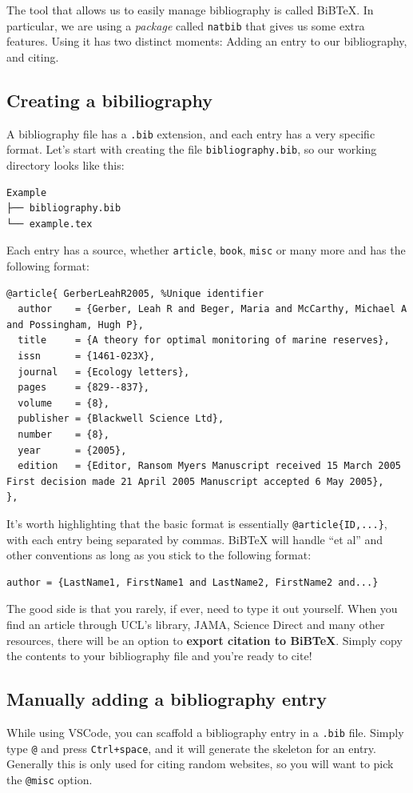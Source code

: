 The tool that allows us to easily manage bibliography is called BiBTeX. In particular, we are using a \emph{package} called \verb|natbib| that gives us some extra features.
Using it has two distinct moments: Adding an entry to our bibliography, and citing.

\clearpage
\subsection{Creating a bibiliography}
A bibliography file has a \verb|.bib| extension, and each entry has a very specific format.
Let's start with creating the file \verb|bibliography.bib|, so our working directory looks like this:
\begin{verbatim}
Example
├── bibliography.bib
└── example.tex
\end{verbatim}

Each entry has a source, whether \verb|article|, \verb|book|, \verb|misc| or many more and has the following format:
\begin{lstlisting}
@article{ GerberLeahR2005, %Unique identifier
  author    = {Gerber, Leah R and Beger, Maria and McCarthy, Michael A and Possingham, Hugh P},
  title     = {A theory for optimal monitoring of marine reserves},
  issn      = {1461-023X},
  journal   = {Ecology letters},
  pages     = {829--837},
  volume    = {8},
  publisher = {Blackwell Science Ltd},
  number    = {8},
  year      = {2005},
  edition   = {Editor, Ransom Myers Manuscript received 15 March 2005 First decision made 21 April 2005 Manuscript accepted 6 May 2005},
},
\end{lstlisting}

It's worth highlighting that the basic format is essentially \verb|@article{ID,...}|, with each entry being separated by commas.
BiBTeX will handle ``et al'' and other conventions as long as you stick to the following format:
\begin{lstlisting}
author = {LastName1, FirstName1 and LastName2, FirstName2 and...}
\end{lstlisting}

The good side is that you rarely, if ever, need to type it out yourself.
When you find an article through UCL's library, JAMA, Science Direct and many other resources, there will be an option to \textbf{export citation to BiBTeX}.
Simply copy the contents to your bibliography file and you're ready to cite!

\subsection{Manually adding a bibliography entry}
While using VSCode, you can scaffold a bibliography entry in a \verb|.bib| file.
Simply type \verb|@| and press \verb|Ctrl+space|, and it will generate the skeleton for an entry.
Generally this is only used for citing random websites, so you will want to pick the \verb|@misc| option.

